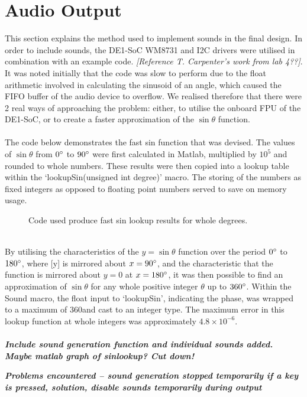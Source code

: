 \documentclass[a4paper,12pt]{article}
\begin{document}
\newpage
\section{Audio Output}
\begin{flushleft}
This section explains the method used to implement sounds in the final design. In order to include sounds, the DE1-SoC WM8731 and I2C drivers were utilised in combination with an example code. \textit{[Reference T. Carpenter’s work from lab 4??]}. It was noted initially that the code was slow to perform due to the float arithmetic involved in calculating the sinusoid of an angle, which caused the FIFO buffer of the audio device to overflow. We realised therefore that there were 2 real ways of approaching the problem: either, to utilise the onboard FPU of the DE1-SoC, or to create a faster approximation of the $\sin\theta$ function.
\\ \- \\
The code below demonstrates the fast sin function that was devised. The values of $\sin\theta$ from $0\degree$ to $90\degree$ were first calculated in Matlab, multiplied by $10^5$ and rounded to whole numbers. These results were then copied into a lookup table within the ‘lookupSin(unsigned int degree)’ macro. The storing of the numbers as fixed integers as opposed to floating point numbers served to save on memory usage.

\begin{figure}[H]
	\centering
	
	\caption{Code used produce fast sin lookup results for whole degrees.}
\end{figure}

\- \\
By utilising the characteristics of the $y=\sin\theta$ function over the period $0\degree$ to $180\degree$, where [y] is mirrored about $x=90\degree$, and the characteristic that the function is mirrored about $y=0$ at $x=180\degree$, it was then possible to find an approximation of $\sin\theta$ for any whole positive integer $\theta$ up to $360\degree$. Within the Sound macro, the float input to ‘lookupSin’, indicating the phase, was wrapped to a maximum of 360\degree and cast to an integer type. The maximum error in this lookup function at whole integers was approximately $4.8\times10^{-6}$.
\\ \- \\

\textbf{\textit{Include sound generation function and individual sounds added. Maybe matlab graph of sinlookup? Cut down!}}

\textbf{\textit{Problems encountered – sound generation stopped temporarily if a key is pressed, solution, disable sounds temporarily during output}}
  

\end{flushleft}
\end{document}

